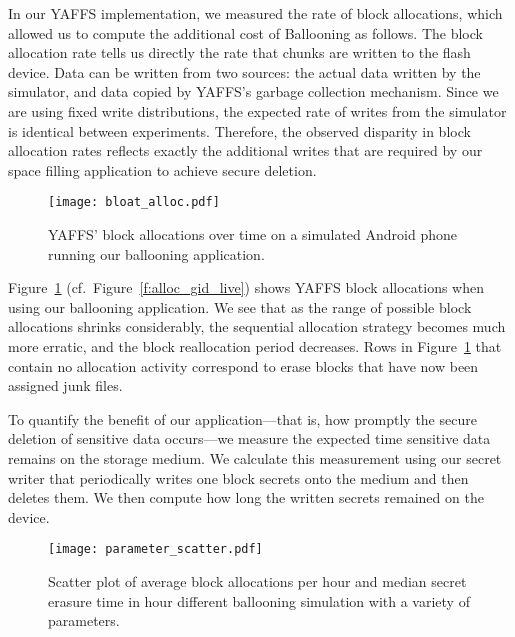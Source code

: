 \documentclass{acmtog}
\begin{document}
In our YAFFS implementation, we
measured the rate of block allocations, which allowed us to compute the
additional cost of Ballooning as follows. The block allocation rate tells us
directly the rate that chunks are written to the flash device. Data can be written from two sources: the
actual data written by the simulator, and data copied by YAFFS's garbage
collection mechanism.  Since we are using fixed write distributions, the expected rate of writes from the simulator is 
identical between experiments. Therefore,
the observed disparity in block allocation rates reflects exactly the additional writes
that are required by our space filling application to achieve secure deletion.

\begin{figure}[t]
\centering
\texttt{[image: bloat\_alloc.pdf]}
\caption{\small YAFFS' block allocations over time on a simulated Android phone running
our ballooning application.
\label{f:bloat_alloc}\normalsize}
\end{figure}


Figure~\ref{f:bloat_alloc} (cf.~Figure~\ref{f:alloc_gid_live}) shows YAFFS block allocations when using
our ballooning application. We see that as the range of possible block
allocations shrinks considerably, the sequential allocation
strategy becomes much more erratic, and the block reallocation period
decreases. Rows in Figure~\ref{f:bloat_alloc} that contain no allocation
activity 
correspond to erase blocks that have now been assigned junk files.


To quantify the benefit of our application---that is, how promptly the secure deletion of
sensitive data occurs---we measure the expected time sensitive data remains
on the storage medium. We calculate this measurement using our secret writer
that periodically
writes one block secrets onto the medium and then deletes them. We then compute
how long the written secrets remained on the device.

\begin{figure}[t]
\centering
\texttt{[image: parameter\_scatter.pdf]}
\caption{\small Scatter plot of average block allocations per hour and median secret erasure time in
hour different ballooning simulation with a variety of parameters.\label{f:parameter_scatter}\normalsize}
\end{figure}
\end{document}
